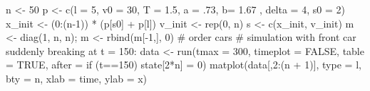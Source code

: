 \documentclass[
  a4paper,
  DIV=11,
  numbers=noendperiod,
  oneside]{scrreprt}
\newenvironment{Shaded}{}{}
\newcommand{\AttributeTok}[1]{\textcolor[rgb]{0.84,0.23,0.29}{#1}}
\newcommand{\CommentTok}[1]{\textcolor[rgb]{0.42,0.45,0.49}{#1}}
\newcommand{\ConstantTok}[1]{\textcolor[rgb]{0.00,0.36,0.77}{#1}}
\newcommand{\DecValTok}[1]{\textcolor[rgb]{0.00,0.36,0.77}{#1}}
\newcommand{\FloatTok}[1]{\textcolor[rgb]{0.00,0.36,0.77}{#1}}
\newcommand{\FunctionTok}[1]{\textcolor[rgb]{0.44,0.26,0.76}{#1}}
\newcommand{\NormalTok}[1]{\textcolor[rgb]{0.14,0.16,0.18}{#1}}
\newcommand{\OtherTok}[1]{\textcolor[rgb]{0.44,0.26,0.76}{#1}}
\newcommand{\SpecialCharTok}[1]{\textcolor[rgb]{0.00,0.36,0.77}{#1}}
\newcommand{\StringTok}[1]{\textcolor[rgb]{0.01,0.18,0.38}{#1}}
\begin{document}
\begin{Shaded}
\begin{Highlighting}[]
\NormalTok{n }\OtherTok{\textless{}{-}} \DecValTok{50}
\NormalTok{p }\OtherTok{\textless{}{-}} \FunctionTok{c}\NormalTok{(}\AttributeTok{l =} \DecValTok{5}\NormalTok{, }\AttributeTok{v0 =} \DecValTok{30}\NormalTok{, }\AttributeTok{T =} \FloatTok{1.5}\NormalTok{, }\AttributeTok{a =}\NormalTok{ .}\DecValTok{73}\NormalTok{, }\AttributeTok{b=} \FloatTok{1.67}\NormalTok{ , }\AttributeTok{delta =} \DecValTok{4}\NormalTok{, }\AttributeTok{s0 =} \DecValTok{2}\NormalTok{)}
\NormalTok{x\_init }\OtherTok{\textless{}{-}}\NormalTok{ (}\DecValTok{0}\SpecialCharTok{:}\NormalTok{(n}\DecValTok{{-}1}\NormalTok{)) }\SpecialCharTok{*}\NormalTok{ (p[}\StringTok{\textquotesingle{}s0\textquotesingle{}}\NormalTok{] }\SpecialCharTok{+}\NormalTok{ p[}\StringTok{\textquotesingle{}l\textquotesingle{}}\NormalTok{])}
\NormalTok{v\_init }\OtherTok{\textless{}{-}} \FunctionTok{rep}\NormalTok{(}\DecValTok{0}\NormalTok{, n)}
\NormalTok{s }\OtherTok{\textless{}{-}} \FunctionTok{c}\NormalTok{(x\_init, v\_init)}
\NormalTok{m }\OtherTok{\textless{}{-}} \FunctionTok{diag}\NormalTok{(}\DecValTok{1}\NormalTok{, n, n); m }\OtherTok{\textless{}{-}} \FunctionTok{rbind}\NormalTok{(m[}\SpecialCharTok{{-}}\DecValTok{1}\NormalTok{,], }\DecValTok{0}\NormalTok{) }\CommentTok{\# order cars}
\CommentTok{\# simulation with front car suddenly breaking at t = 150:}
\NormalTok{data }\OtherTok{\textless{}{-}} \FunctionTok{run}\NormalTok{(}\AttributeTok{tmax =} \DecValTok{300}\NormalTok{, }\AttributeTok{timeplot =} \ConstantTok{FALSE}\NormalTok{, }\AttributeTok{table =} \ConstantTok{TRUE}\NormalTok{,}
            \AttributeTok{after =} \StringTok{\textquotesingle{}if (t==150) state[2*n] = 0\textquotesingle{}}\NormalTok{)}
\FunctionTok{matplot}\NormalTok{(data[,}\DecValTok{2}\SpecialCharTok{:}\NormalTok{(n }\SpecialCharTok{+} \DecValTok{1}\NormalTok{)], }\AttributeTok{type =} \StringTok{\textquotesingle{}l\textquotesingle{}}\NormalTok{, }\AttributeTok{bty =} \StringTok{\textquotesingle{}n\textquotesingle{}}\NormalTok{, }\AttributeTok{xlab =} \StringTok{\textquotesingle{}time\textquotesingle{}}\NormalTok{, }\AttributeTok{ylab =} \StringTok{\textquotesingle{}x\textquotesingle{}}\NormalTok{)}
\end{Highlighting}
\end{Shaded}
\end{document}
